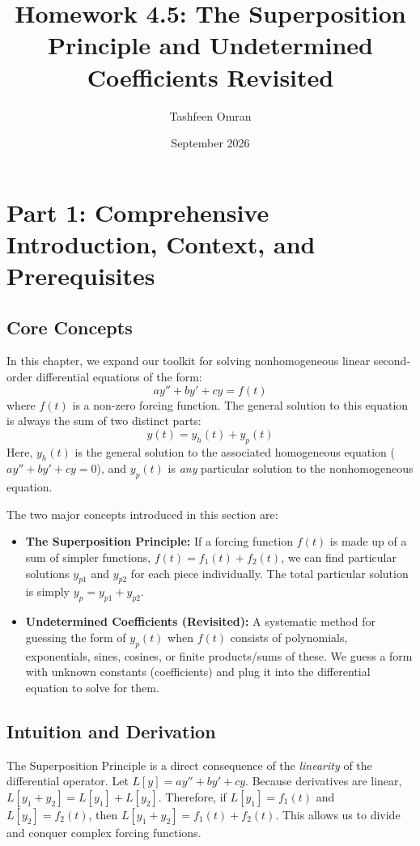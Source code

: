 \documentclass[12pt]{article}
\title{\textbf{Homework 4.5: The Superposition Principle and Undetermined Coefficients Revisited}}
\author{Tashfeen Omran}
\date{September 2026}
\begin{document}
\maketitle
\tableofcontents
\newpage

\section{Part 1: Comprehensive Introduction, Context, and Prerequisites}

\subsection{Core Concepts}
In this chapter, we expand our toolkit for solving nonhomogeneous linear second-order differential equations of the form:
\[ a y'' + b y' + c y = f(t) \]
where $f(t)$ is a non-zero forcing function. The general solution to this equation is always the sum of two distinct parts:
\[ y(t) = y_h(t) + y_p(t) \]
Here, $y_h(t)$ is the general solution to the associated homogeneous equation ($a y'' + b y' + c y = 0$), and $y_p(t)$ is \textit{any} particular solution to the nonhomogeneous equation. 

The two major concepts introduced in this section are:
\begin{itemize}
    \item \textbf{The Superposition Principle:} If a forcing function $f(t)$ is made up of a sum of simpler functions, $f(t) = f_1(t) + f_2(t)$, we can find particular solutions $y_{p1}$ and $y_{p2}$ for each piece individually. The total particular solution is simply $y_p = y_{p1} + y_{p2}$.
    \item \textbf{Undetermined Coefficients (Revisited):} A systematic method for guessing the form of $y_p(t)$ when $f(t)$ consists of polynomials, exponentials, sines, cosines, or finite products/sums of these. We guess a form with unknown constants (coefficients) and plug it into the differential equation to solve for them.
\end{itemize}

\subsection{Intuition and Derivation}
The Superposition Principle is a direct consequence of the \textit{linearity} of the differential operator. Let $L[y] = a y'' + b y' + c y$. Because derivatives are linear, $L[y_1 + y_2] = L[y_1] + L[y_2]$. Therefore, if $L[y_1] = f_1(t)$ and $L[y_2] = f_2(t)$, then $L[y_1 + y_2] = f_1(t) + f_2(t)$. This allows us to divide and conquer complex forcing functions.
\end{document}
